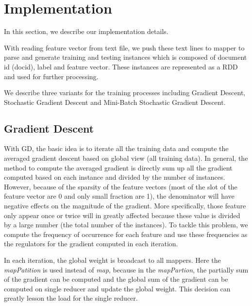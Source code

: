 \documentclass[sigconf]{acmart}
\begin{document}
\section{Implementation}
\label{sec:implementation}

In this section, we describe our implementation details. 

With reading feature vector from text file, we push these text lines to mapper to parse and generate training and testing instances which is composed of document id (docid), label and feature vector. These instances are represented as a RDD and used for further processing. 

We describe three variants for the training processes including Gradient Descent, Stochastic Gradient Descent and Mini-Batch Stochastic Gradient Descent.

\subsection{Gradient Descent}
\label{sec:implementationGD}

With GD, the basic idea is to iterate all the training data and compute the averaged gradient descent based on global view (all training data). In general, the method to compute the averaged gradient is directly sum up all the gradient computed based on each instance and divided by the number of instances. However, because of the sparsity of the feature vectors (most of the slot of the feature vector are 0 and only small fraction are 1), the denominator will have negative effects on the magnitude of the gradient. More specifically, those feature only appear once or twice will in greatly affected because these value is divided by a large number (the total number of the instances). To tackle this problem, we compute the frequency of occurrence for each feature and use these frequencies as the regulators for the gradient computed in each iteration.

In each iteration, the global weight is broadcast to all mappers. Here the \textit{mapPatition} is used instead of \textit{map}, because in the \textit{mapPartion}, the partially sum of the gradient can be computed and the global sum of the gradient can be computed on single reducer and update the global weight. This decision can greatly lesson the load for the single reducer.
\end{document}
